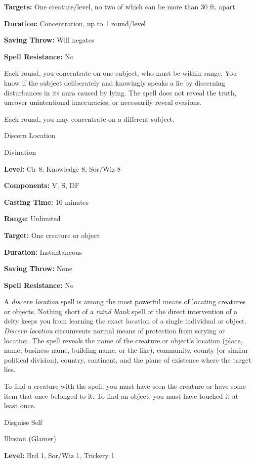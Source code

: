 \documentclass{article}
\begin{document}
\textbf{Targets:} One creature/level, no two of which can be more than 30 ft. apart

\textbf{Duration:} Concentration, up to 1 round/level

\textbf{Saving Throw: }Will negates

\textbf{Spell Resistance:} No

Each round, you concentrate on one subject, who must be within range. You know 
if the subject deliberately and knowingly speaks a lie by discerning disturbances 
in its aura caused by lying. The spell does not reveal the truth, uncover unintentional 
inaccuracies, or necessarily reveal evasions.

Each round, you may concentrate on a different subject.

\vspace{12pt}
Discern Location

Divination

\textbf{Level:} Clr 8, Knowledge 8, Sor/Wiz 8

\textbf{Components:} V, S, DF

\textbf{Casting Time:} 10 minutes

\textbf{Range:} Unlimited

\textbf{Target:} One creature or object

\textbf{Duration:} Instantaneous

\textbf{Saving Throw:} None

\textbf{Spell Resistance:} No

A \textit{discern location }spell is among the most powerful means of locating 
creatures or objects. Nothing short of a \textit{mind blank }spell or the direct 
intervention of a deity keeps you from learning the exact location of a single 
individual or object. \textit{Discern location }circumvents normal means of protection 
from scrying or location. The spell reveals the name of the creature or object's 
location (place, name, business name, building name, or the like), community, county 
(or similar political division), country, continent, and the plane of existence 
where the target lies.

To find a creature with the spell, you must have seen the creature or have some 
item that once belonged to it. To find an object, you must have touched it at least 
once.

\vspace{12pt}
Disguise Self

Illusion (Glamer)

\textbf{Level:} Brd 1, Sor/Wiz 1, Trickery 1
\end{document}
